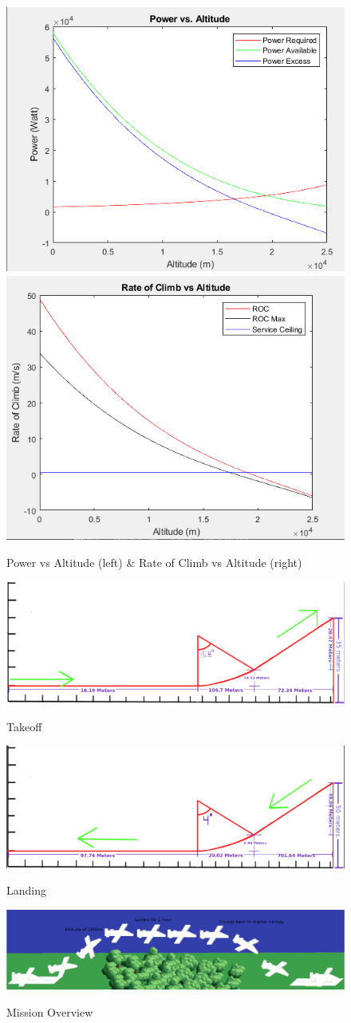 \documentclass[12pt,A4paper]{article}
\begin{document}
	\begin{figure}[!h]
		\centering
		\includegraphics[width=.375\textwidth]{PowerVAltitude.png}\hspace{0.02 in} \label{fig:f5}
		\includegraphics[width=.375\textwidth]{RateofClimb.PNG} \label{fig:f6}
		\caption{Power vs Altitude (left) \& Rate of Climb vs Altitude (right)}
	\end{figure}
	\begin{figure}[!h]
		\centering
		\includegraphics[width=.5\textwidth]{TakeOff.PNG} \label{fig:f7}
		\caption{Takeoff}
	\end{figure}
	\begin{figure}[!h]
		\centering
		\includegraphics[width=.5\textwidth]{Landing.PNG} \label{fig:f8}
		\caption{Landing}
	\end{figure}
	\begin{figure}[!h]
		\centering
		\includegraphics[width=.5\textwidth]{Mission.PNG} \label{fig:f9}
		\caption{Mission Overview}
	\end{figure}
\end{document}
